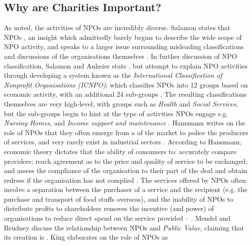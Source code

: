 \subsection{Why are Charities Important?}
As noted, the activities of NPOs are incredibly diverse. Salamon states that NPOs , an insight which admittedly barely begins to describe the wide scope of NPO activity, and speaks to a larger issue surrounding misleading classifications and discussions of the organisations themselves \cite{salamon_rise_1994, salamon_search_1992-1}. In further discussion of NPO classification, Salamon and Anheier state , but attempt to explain NPO activities through developing a system known as the \textit{International Classification of Nonprofit Organisations (ICNPO)}; which classifies NPOs into 12 groups based on economic activity, with an additional 24 sub-groups \cite{salamon_search_1992-1}. The resulting classifications themselves are very high-level, with groups such as \textit{Health} and \textit{Social Services}, but the sub-groups begin to hint at the type of activities NPOs engage e.g. \textit{Nursing Homes}, and \textit{Income support and maintenance} \cite{salamon_search_1992-1}.
%
Hansmann writes on the role of NPOs that they often emerge from a  of the market to police the producers of services, and very rarely exist in industrial sectors \cite{hansmann_role_1980}. According to Hansmann, economic theory dictates that the ability of consumers to: accurately compare providers; reach agreement as to the price and quality of service to be exchanged; and assess the compliance of the organisation to their part of the deal and obtain redress if the organisation has not complied \cite{hansmann_role_1980}. The services offered by NPOs often involve a separation between the purchaser of a service and the recipient (e.g. the purchase and transport of food stuffs overseas), and the inability of NPOs to distribute profits to shareholders removes the incentive (and power) of organisations to reduce direct spend on the service provided --  \cite{hansmann_role_1980}.
%
Mendel and Brudney discuss the relationship between NPOs and \textit{Public Value}, claiming that its creation is  \cite{mendel_doing_2014}. King elaborates on the role of NPOs as%
